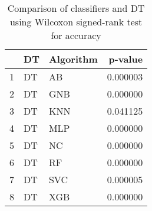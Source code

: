 \begin{table}
\footnotesize
\caption{Comparison of classifiers and DT using Wilcoxon signed-rank test for accuracy}
\label{tab:DT wilcoxon ACC comparison}
\begin{tabular}{lllr}
\hline
 & DT & Algorithm & p-value \\
\hline
1 & DT & AB & 0.000003 \\
2 & DT & GNB & 0.000000 \\
3 & DT & KNN & 0.041125 \\
4 & DT & MLP & 0.000000 \\
5 & DT & NC & 0.000000 \\
6 & DT & RF & 0.000000 \\
7 & DT & SVC & 0.000005 \\
8 & DT & XGB & 0.000000 \\
\hline
\end{tabular}
\end{table}
